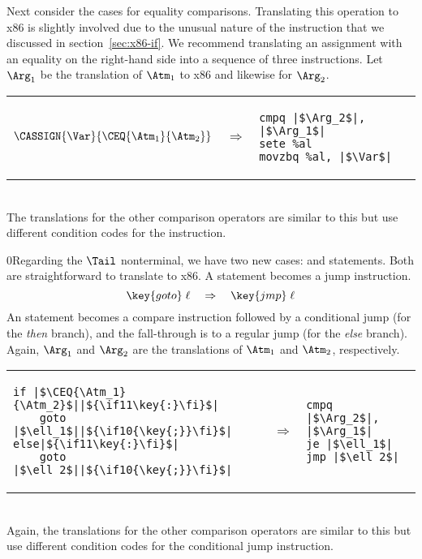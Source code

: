 \documentclass[7x10]{TimesAPriori_MIT}%
\def\racketEd{0}
\def\pythonEd{1}
\def\edition{1}
\newcommand{\racket}[1]{{\if\edition\racketEd{#1}\fi}}
\newcommand{\pythonColor}[0]{}
\newcommand{\python}[1]{{\if\edition\pythonEd\pythonColor #1\fi}}
\numberwithin{theorem}{chapter}
\numberwithin{definition}{chapter}
\numberwithin{equation}{chapter}
\begin{document}
Next consider the cases for equality comparisons.  Translating this
operation to x86 is slightly involved due to the unusual nature of the
 instruction that we discussed in section~\ref{sec:x86-if}.
We recommend translating an assignment with an equality on the
right-hand side into a sequence of three instructions. Let $\Arg_1$
be the translation of $\Atm_1$ to x86 and likewise for $\Arg_2$.\\
\begin{tabular}{lll}
\begin{minipage}{0.4\textwidth}
$\CASSIGN{\Var}{ \CEQ{\Atm_1}{\Atm_2} }$ 
\end{minipage}
&
$\Rightarrow$
&
\begin{minipage}{0.4\textwidth}
\begin{lstlisting}
cmpq |$\Arg_2$|, |$\Arg_1$|
sete %al
movzbq %al, |$\Var$|
\end{lstlisting}
\end{minipage}
\end{tabular}  \\
The translations for the other comparison operators are similar to
this but use different condition codes for the  instruction.

\racket{Regarding the $\Tail$ nonterminal, we have two new cases:
  \key{goto} and \key{if} statements. Both are straightforward to
  translate to x86.}
%
A  statement becomes a jump instruction.
\[
\key{goto}\; \ell\racket{\key{;}} \quad \Rightarrow \quad \key{jmp}\;\ell
\]
%
An  statement becomes a compare instruction followed by a
conditional jump (for the \emph{then} branch), and the fall-through is to
a regular jump (for the \emph{else} branch). Again, $\Arg_1$ and $\Arg_2$
are the translations of $\Atm_1$ and $\Atm_2$, respectively.\\
\begin{tabular}{lll}
\begin{minipage}{0.4\textwidth}
\begin{lstlisting}
if |$\CEQ{\Atm_1}{\Atm_2}$||$\python{\key{:}}$|
    goto |$\ell_1$||$\racket{\key{;}}$|
else|$\python{\key{:}}$|
    goto |$\ell_2$||$\racket{\key{;}}$|
\end{lstlisting}
\end{minipage}
&
$\Rightarrow$
&
\begin{minipage}{0.4\textwidth}
\begin{lstlisting}
cmpq |$\Arg_2$|, |$\Arg_1$|
je |$\ell_1$|
jmp |$\ell_2$|
\end{lstlisting}
\end{minipage}
\end{tabular}  \\
Again, the translations for the other comparison operators are similar to this
but use different condition codes for the conditional jump instruction.
\end{document}
